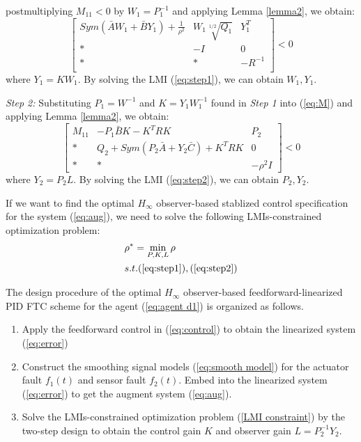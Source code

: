 \documentclass{ieeeaccess}
\begin{document}
postmultiplying $M_{11}<0$ by $W_1=P_1^{-1}$ and applying Lemma \ref{lemma2}, we obtain:
\begin{equation} \label{eq:step1}
    \begin{bmatrix}
        Sym(\bar{A}W_1+\bar{B}Y_1) + \frac{1}{\rho^2} & W_1\sqrt[1/2]{Q_1} & Y_1^T \\
        * & -I & 0\\
        * & * & -R^{-1}\\
    \end{bmatrix} < 0
\end{equation}
where $Y_1=KW_1$. By solving the LMI (\ref{eq:step1}), we can obtain $W_1,Y_1$.

\textit{Step 2:} Substituting $P_1=W^{-1}$ and $K=Y_1W_1^{-1}$ found in \textit{Step 1} into (\ref{eq:M}) and applying Lemma \ref{lemma2}, we obtain:
\begin{equation} \label{eq:step2}
    \begin{bmatrix}
        M_{11} & -P_1\bar{B}K - K^TRK & P_2 \\
        * & Q_2+Sym(P_2\bar{A}+Y_2\bar{C}) + K^TRK & 0 \\
        * & * & -\rho^2I
    \end{bmatrix} < 0
\end{equation}
where $Y_2=P_2L$. By solving the LMI (\ref{eq:step2}), we can obtain $P_2,Y_2$.


If we want to find the optimal $H_\infty$ observer-based stablized control specification for the system (\ref{eq:aug}), we need to solve the following LMIs-constrained optimization problem:
\begin{equation} \label{LMI constraint}
    \begin{split}
        & \rho^*=\mathop{\min}_{P,K,L} \rho \\
        & s.t. (\refeq{eq:step1}),(\refeq{eq:step2}) 
    \end{split}
\end{equation}

The design procedure of the optimal $H_\infty$ observer-based feedforward-linearized PID FTC scheme for the agent (\ref{eq:agent d1}) is organized as follows.
\begin{enumerate}
    \item Apply the feedforward control in (\ref{eq:control}) to obtain the linearized system (\ref{eq:error})
    \item Construct the smoothing signal models (\ref{eq:smooth model}) for the actuator fault $f_1(t)$ and sensor fault $f_2(t)$. Embed into the linearized system (\ref{eq:error}) to get the augment system (\ref{eq:aug}).
    \item Solve the LMIs-constrained optimization problem (\ref{LMI constraint}) by the two-step design to obtain the control gain $K$ and observer gain $L=P_2^{-1}Y_2$.
\end{enumerate}
\end{document}
